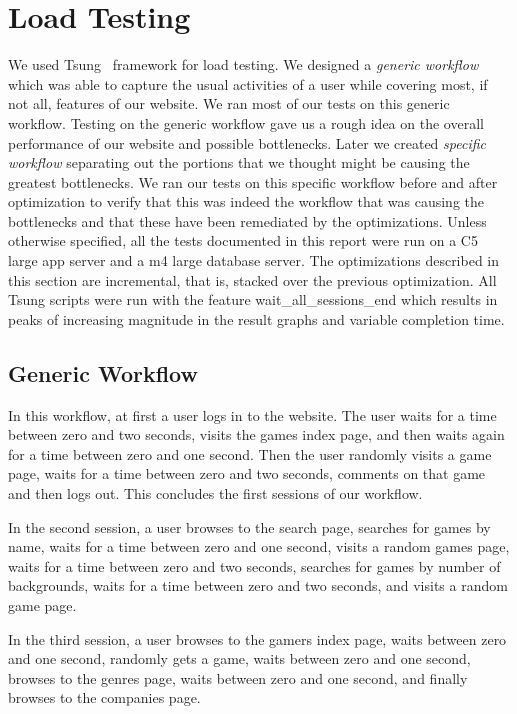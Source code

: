 \chapter{Load Testing}
We used Tsung~\cite{tsung} framework for load testing. We designed a \textit{generic workflow} which was able to capture the usual activities of a user while covering most, if not all, features of our website. We ran most of our tests on this generic workflow. Testing on the generic workflow gave us a rough idea on the overall performance of our website and possible bottlenecks. Later we created \textit{specific workflow} separating out the portions that we thought might be causing the greatest bottlenecks. We ran our tests on this specific workflow before and after optimization to verify that this was indeed the workflow that was causing the bottlenecks and that these have been remediated by the optimizations. Unless otherwise specified, all the tests documented in this report were run on a C5 large app server and a m4 large database server. The optimizations described in this section are incremental, that is, stacked over the previous optimization. All Tsung scripts were run with the feature wait\_all\_sessions\_end which results in peaks of increasing magnitude in the result graphs and variable completion time. 

\section{Generic Workflow}\label{sec:generic-workflow}
In this workflow, at first a user logs in to the website. The user waits for a time between zero and two seconds, visits the games index page, and then waits again for a time between zero and one second. Then the user randomly visits a game page, waits for a time between zero and two seconds, comments on that game and then logs out. This concludes the first sessions of our workflow. 

In the second session, a user browses to the search page, searches for games by name, waits for a time between zero and one second, visits a random games page, waits for a time between zero and two seconds, searches for games by number of backgrounds, waits for a time between zero and two seconds, and visits a random game page. 

In the third session, a user browses to the gamers index page, waits between zero and one second, randomly gets a game, waits between zero and one second, browses to the genres page, waits between zero and one second, and finally browses to the companies page.

